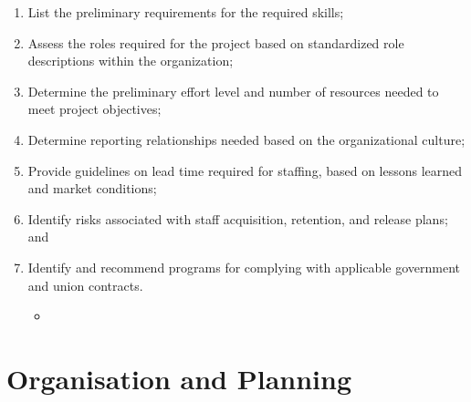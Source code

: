 \begin{enumerate}
\item List the preliminary requirements for the required skills; 
\item Assess the roles required for the project based on standardized role descriptions within the organization;
\item Determine the preliminary effort level and number of resources needed to meet project objectives;
\item Determine reporting relationships needed based on the organizational culture;
\item Provide guidelines on lead time required for staffing, based on lessons learned and market conditions;
\item Identify risks associated with staff acquisition, retention, and release plans; and
\item Identify and recommend programs for complying with applicable government and union contracts.
\begin{itemize}
\item \parencite{pmbok}
\end{itemize}
\end{enumerate}

\section{Organisation and Planning}

